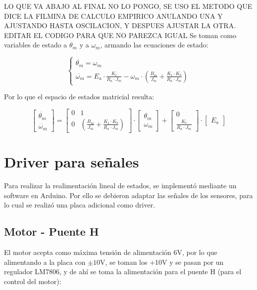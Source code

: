 \documentclass{article}
\begin{document}
LO QUE VA ABAJO AL FINAL NO LO PONGO, SE USO EL METODO QUE DICE LA FILMINA DE CALCULO EMPIRICO ANULANDO UNA Y AJUSTANDO HASTA OSCILACION, Y DESPUES AJUSTAR LA OTRA. EDITAR EL CODIGO PARA QUE NO PAREZCA IGUAL
Se toman como variables de estado a $\theta_m$ y a $\omega_m$, armando las ecuaciones de estado:

\[
\left\lbrace
\begin{array}{ll}
\dot{\theta_m} = \omega_m \\
\dot{\omega_m} = E_a \cdot \frac{K_t}{R_a \cdot J_m} - \omega_m \cdot ( \frac{B_m}{J_m} + \frac{K_t \cdot K_b}{R_a \cdot J_m} )
\end{array}
\right.
\]

Por lo que el espacio de estados matricial resulta:

\[
\begin{bmatrix}
\dot{\theta_m} \\
\dot{\omega_m} 
\end{bmatrix}
=
\begin{bmatrix}
0 & 1 \\
0 & \left( \frac{B_m}{J_m} + \frac{K_t \cdot K_b}{R_a \cdot J_m} \right) 
\end{bmatrix}
\cdot
\begin{bmatrix}
\theta_m \\
\omega_m 
\end{bmatrix}
+
\begin{bmatrix}
0 \\
\frac{K_t}{R_a \cdot J_m}
\end{bmatrix}
\cdot
\begin{bmatrix}
E_a
\end{bmatrix}
\]

\section{Driver para señales}

Para realizar la realimentación lineal de estados, se implementó mediante un software en Arduino. Por ello se debieron adaptar las señales de los sensores, para lo cual se realizó una placa adicional como driver.

\subsection{Motor - Puente H}
El motor acepta como máxima tensión de alimentación 6V, por lo que alimentando a la placa con $\pm 10$V, se toman los +10V y se pasan por un regulador LM7806, y de ahí se toma la alimentación para el puente H (para el control del motor):
\end{document}
